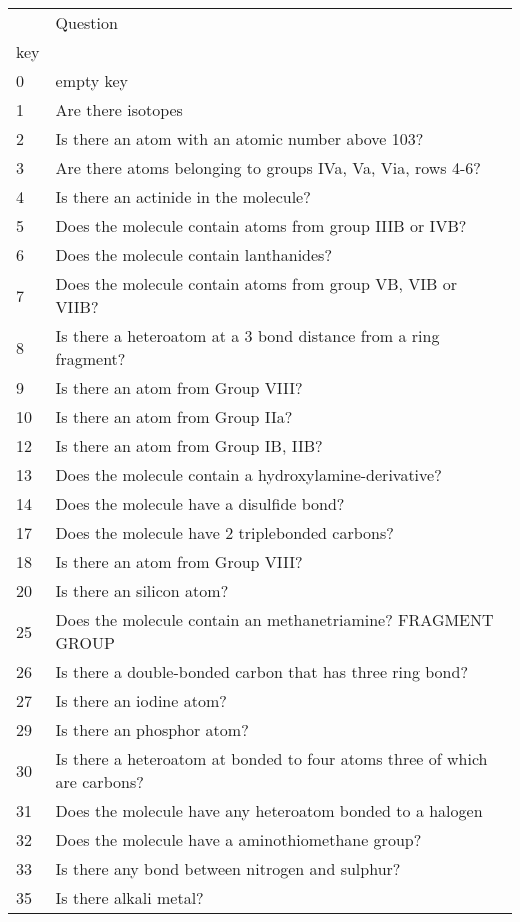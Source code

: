 \begin{tabular}{ll}
\toprule
 & Question \\
key &  \\
\midrule
0 &  empty key \\
1 &  Are there isotopes  \\
2 &  Is there an atom with an atomic number above 103?   \\
3 &  Are there atoms belonging to groups IVa, Va, Via, rows 4-6?  \\
4 &  Is there an actinide in the molecule?   \\
5 &  Does the molecule contain atoms from group IIIB or IVB?  \\
6 &  Does the molecule contain lanthanides?  \\
7 &  Does the molecule contain atoms from group VB, VIB or VIIB?  \\
8 &  Is there a heteroatom at a 3 bond distance from a ring fragment?   \\
9 &  Is there an atom from Group VIII?  \\
10 &  Is there an atom from Group IIa?  \\
12 &  Is there an atom from Group IB, IIB?  \\
13 &  Does the molecule contain a hydroxylamine-derivative?  \\
14 &  Does the molecule have a disulfide bond?   \\
17 &  Does the molecule have 2 triplebonded carbons?   \\
18 &  Is there an atom from Group VIII?  \\
20 &  Is there an silicon atom?  \\
25 &  Does the molecule contain an methanetriamine? FRAGMENT GROUP  \\
26 &  Is there a double-bonded carbon that has three ring bond?   \\
27 &  Is there an iodine atom?  \\
29 &  Is there an phosphor atom?  \\
30 &  Is there a heteroatom at bonded to four atoms three of which are carbons?   \\
31 &  Does the molecule have any heteroatom bonded to a halogen   \\
32 &  Does the molecule have a aminothiomethane group?   \\
33 &  Is there any bond between nitrogen and sulphur?   \\
35 &  Is there alkali metal?  \\

\end{tabular}
